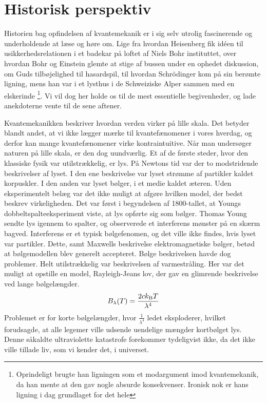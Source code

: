 \documentclass[../Kvantemekanik.tex]{subfiles}
\begin{document}
\section{Historisk perspektiv}
Historien bag opfindelsen af kvantemekanik er i sig selv utrolig fascinerende og underholdende at læse og høre om. Lige fra hvordan Heisenberg fik idéen til usikkerhedsrelationen i et badekar på loftet af Niels Bohr instituttet, over hvordan Bohr og Einstein glemte at stige af bussen under en ophedet diskussion, om Guds tilbøjelighed til hasardspil, til hvordan Schrödinger kom på sin berømte ligning, mens han var i et lysthus i de Schweiziske Alper sammen med en elskerinde \footnote{Oprindeligt brugte han ligningen som et modargument imod kvantemekanik, da han mente at den gav nogle absurde konsekvenser. Ironisk nok er hans ligning i dag grundlaget  for det hele}. Vi vil dog her holde os til de mest essentielle begivenheder, og lade anekdoterne vente til de sene aftener.


Kvantemekanikken beskriver hvordan verden virker på lille skala.
Det betyder blandt andet, at vi ikke lægger mærke til kvantefænomener i vores hverdag, og derfor kan mange kvantefænomener virke kontraintuitive.
Når man undersøger naturen på lille skala, er den dog uundværlig.
Et af de første steder, hvor den klassiske fysik var utilstrækkelig, er lys.
På Newtons tid var der to modstridende beskrivelser af lyset.
I den ene beskrivelse var lyset strømme af partikler kaldet korpuskler.
I den anden var lyset bølger, i et medie kaldet æteren.
Uden eksperimentelt belæg var det ikke muligt at afgøre hvilken model, der bedst beskrev virkeligheden.
Det var først i begyndelsen af 1800-tallet, at Youngs dobbeltspalteeksperiment viste, at lys opførte sig som bølger.
Thomas Young sendte lys igennem to spalter, og observerede et interferens mønster på en skærm bagved.
Interferens er et typisk bølgefenomen, og det ville ikke findes, hvis lyset var partikler.
Dette, samt Maxwells beskrivelse elektromagnetiske bølger, betød at bølgemodellen blev generelt accepteret.
Bølge beskrivelsen havde dog problemer.
Helt utilstrækkelig var beskrivelsen af varmestråling.
Her var det muligt at opstille en model, Rayleigh-Jeans lov, der gav en glimrende beskrivelse ved lange bølgelængder.
\begin{equation}
B_\lambda (T)= \frac{2ck_{\text{B}}T}{\lambda^4}
\end{equation}
Problemet er for korte bølgelængder, hvor $\frac{1}{\lambda^4}$ ledet eksploderer, hvilket forudsagde, at alle legemer ville udsende uendelige mængder kortbølget lys. Denne såkaldte ultraviolette katastrofe forekommer tydeligvist ikke, da det ikke ville tillade liv, som vi kender det, i universet.
\end{document}
